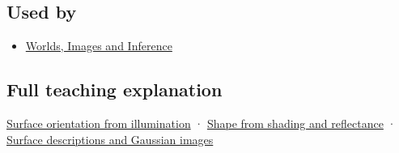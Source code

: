 \subsection{Used by}\label{appendix-89b2d5b7c9e1-used-by}

\begin{itemize}
\tightlist
\item
  \href{Continuous\%20Notes/University\%20-\%20Worlds,\%20Images\%20and\%20Inference\%20-\%20Graphics,\%20Vision\%20and\%20Photography}{Worlds, Images and Inference}
\end{itemize}

\subsection{Full teaching explanation}\label{appendix-89b2d5b7c9e1-full-teaching-explanation}

\hyperref[04-visual-computing-ii-ch032-surface-orientation-from-illumination]{Surface orientation from illumination} · \hyperref[04-visual-computing-ii-ch032-shape-from-shading-and-reflectance]{Shape from shading and reflectance} · \hyperref[04-visual-computing-ii-ch032-surface-descriptions-and-gaussian-images]{Surface descriptions and Gaussian images}

